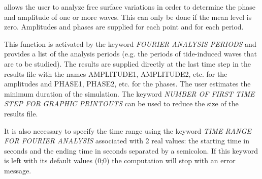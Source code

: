   allows the user to analyze free surface variations in order to determine the phase and amplitude of one or more waves. This can only be done if the mean level is zero. Amplitudes and phases are supplied for each point and for each period.

 This function is activated by the keyword \textit{FOURIER ANALYSIS PERIODS}  and provides a list of the analysis periods (e.g. the periods of tide-induced waves that are to be studied). The results are supplied directly at the last time step in the results file with the names AMPLITUDE1, AMPLITUDE2, etc. for the amplitudes and PHASE1, PHASE2, etc. for the phases. The user estimates the minimum duration of the simulation. The keyword \textit{NUMBER OF FIRST TIME STEP FOR GRAPHIC PRINTOUTS} can be used to reduce the size of the results file.

 It is also necessary to specify the time range using the keyword \textit{TIME RANGE FOR FOURIER ANALYSIS} associated with 2 real values: the starting time in seconds and the ending time in seconds separated by a semicolon. If this keyword is left with its default values (0;0) the computation will stop with an error message.


